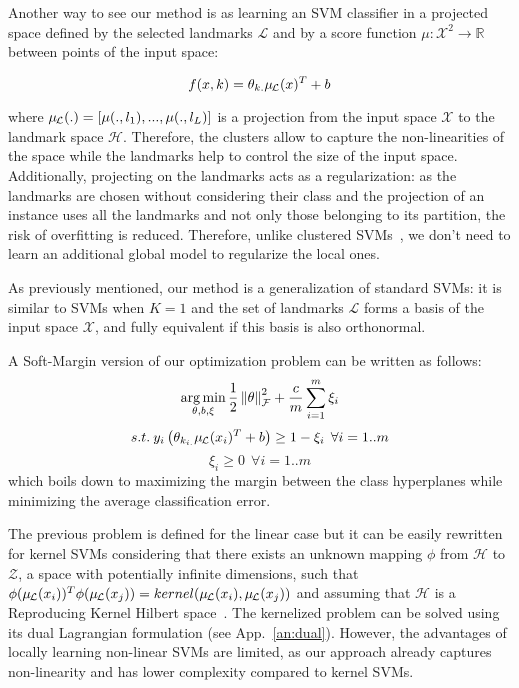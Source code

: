 Another way to see our method is as learning an SVM classifier in a projected space defined by the selected landmarks $\mathcal{L}$ and by a score function $\mu: \mathcal{X}^2 \to \mathbb{R}$ between points of the input space:

$$ f(x,k) = \theta_{k.} \mul{x}^T + b$$

where $\mul{.} = [\mu(.,l_1),...,\mu(.,l_L)]$ is a projection from the input space $\mathcal{X}$ to the landmark space $\mathcal{H}$.
Therefore, the clusters allow to capture the non-linearities of the space while the landmarks help to control the size of the input space. %
Additionally, projecting on the landmarks acts as a regularization: as the landmarks are chosen without considering their class and the projection of an instance uses all the landmarks and not only those belonging to its partition, the risk of overfitting is reduced. Therefore, unlike clustered SVMs~\cite{gu2013clustered}, we don't need to learn an additional global model to regularize the local ones. 

As previously mentioned, our method is a generalization of standard SVMs: it is similar to SVMs when $K = 1$ and the set of landmarks $\mathcal{L}$ forms a basis of the input space $\mathcal{X}$, and fully equivalent if this basis is also orthonormal.

A Soft-Margin version of our optimization problem can be written as follows:
$$ \operatorname*{arg\,min}_{\theta,b,\xi} \frac{1}{2} \left\| \theta \right\|_{\mathcal{F}}^2 + \frac{c}{m} \sum_{i=1}^m \xi_i$$
$$s.t. \: y_i \left(\theta_{k_{i.}} \mul{x_i}^T + b \right) \geq 1- \xi_i \:\: \forall i=1..m$$
$$\xi_i \geq 0 \:\: \forall i=1..m$$
which boils down to maximizing the margin between the class hyperplanes while minimizing the average classification error.

\label{sec:where:cankerneltrick}
The previous problem is defined for the linear case but it can be easily rewritten for kernel SVMs considering that there exists an unknown mapping $\phi$ from $\mathcal{H}$ to $\mathcal{Z}$, a space with potentially infinite dimensions, such that $\phi(\mul{x_i})^T\phi(\mul{x_j}) = kernel(\mul{x_i},\mul{x_j})$ and assuming that $\mathcal{H}$ is a Reproducing Kernel Hilbert space~\cite{aronszajn1950theory}.
The kernelized problem can be solved using its dual Lagrangian formulation (see App.~\ref{an:dual}).
However, the advantages of locally learning non-linear SVMs are limited, as our approach already captures non-linearity and has lower complexity compared to kernel SVMs. 

